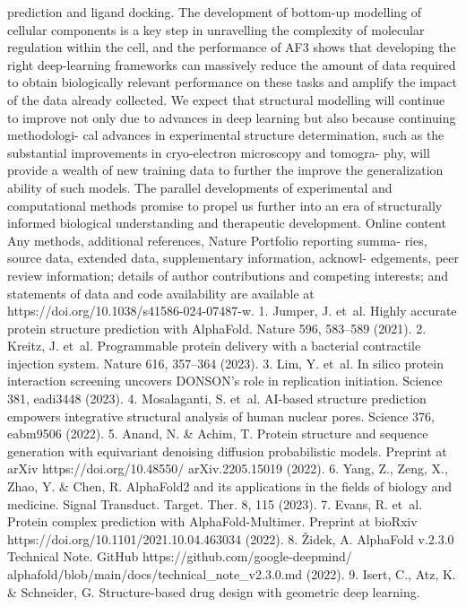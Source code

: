 prediction and ligand docking.
The development of bottom-up modelling of cellular components
is a key step in unravelling the complexity of molecular regulation
within the cell, and the performance of AF3 shows that developing the
right deep-learning frameworks can massively reduce the amount of
data required to obtain biologically relevant performance on these
tasks and amplify the impact of the data already collected. We expect
that structural modelling will continue to improve not only due to
advances in deep learning but also because continuing methodologi-
cal advances in experimental structure determination, such as the
substantial improvements in cryo-electron microscopy and tomogra-
phy, will provide a wealth of new training data to further the improve
the generalization ability of such models. The parallel developments
of experimental and computational methods promise to propel us
further into an era of structurally informed biological understanding
and therapeutic development.
Online content
Any methods, additional references, Nature Portfolio reporting summa-
ries, source data, extended data, supplementary information, acknowl-
edgements, peer review information; details of author contributions
and competing interests; and statements of data and code availability
are available at https://doi.org/10.1038/s41586-024-07487-w.
1.
Jumper, J. et al. Highly accurate protein structure prediction with AlphaFold. Nature 596,
583–589 (2021).
2.
Kreitz, J. et al. Programmable protein delivery with a bacterial contractile injection system.
Nature 616, 357–364 (2023).
3.
Lim, Y. et al. In silico protein interaction screening uncovers DONSON’s role in replication
initiation. Science 381, eadi3448 (2023).
4.
Mosalaganti, S. et al. AI-based structure prediction empowers integrative structural
analysis of human nuclear pores. Science 376, eabm9506 (2022).
5.
Anand, N. \& Achim, T. Protein structure and sequence generation with equivariant
denoising diffusion probabilistic models. Preprint at arXiv https://doi.org/10.48550/
arXiv.2205.15019 (2022).
6.
Yang, Z., Zeng, X., Zhao, Y. \& Chen, R. AlphaFold2 and its applications in the fields of
biology and medicine. Signal Transduct. Target. Ther. 8, 115 (2023).
7.
Evans, R. et al. Protein complex prediction with AlphaFold-Multimer. Preprint at bioRxiv
https://doi.org/10.1101/2021.10.04.463034 (2022).
8.
Židek, A. AlphaFold v.2.3.0 Technical Note. GitHub https://github.com/google-deepmind/
alphafold/blob/main/docs/technical\_note\_v2.3.0.md (2022).
9.
Isert, C., Atz, K. \& Schneider, G. Structure-based drug design with geometric deep learning.
